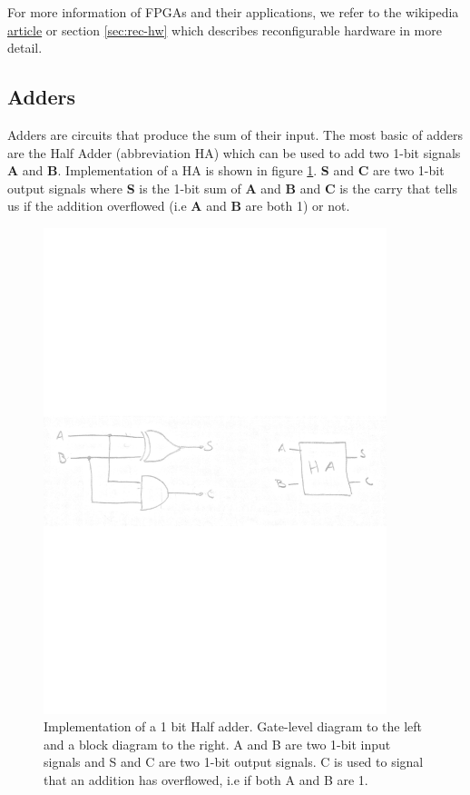 \documentclass{article}
\begin{document}
For more information of FPGAs and their applications, we refer to the
wikipedia
\href{https://en.wikipedia.org/wiki/Field-programmable_gate_array#Applications}{article}
or section \ref{sec:rec-hw} which describes reconfigurable hardware in
more detail.

\subsection{Adders}

Adders are circuits that produce the sum of their input. The most
basic of adders are the Half Adder (abbreviation HA) which can be used
to add two 1-bit signals {\bf A} and {\bf B}. Implementation of a HA
is shown in figure \ref{fig:ha}. {\bf S} and {\bf C} are two 1-bit
output signals where {\bf S} is the 1-bit sum of {\bf A} and {\bf B}
and {\bf C} is the carry that tells us if the addition overflowed (i.e
{\bf A} and {\bf B} are both 1) or not.

\begin{figure}[ht]
  \centering
  \includegraphics[width=10cm]{images/HA.pdf}
  \caption{Implementation of a 1 bit Half adder. Gate-level diagram to
    the left and a block diagram to the right. A and B are two 1-bit
    input signals and S and C are two 1-bit output signals. C is used
    to signal that an addition has overflowed, i.e if both A and B are
    1.}
  \label{fig:ha}
\end{figure}
\end{document}
